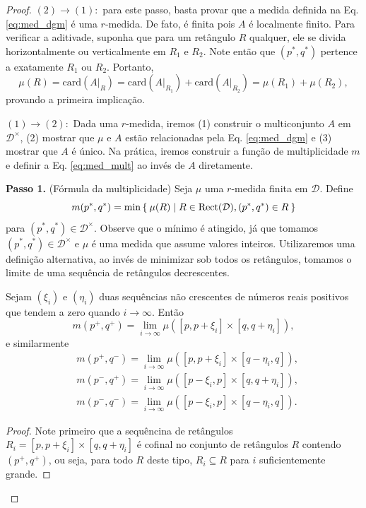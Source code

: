 \begin{proof}
$(2) \to (1):$ para este passo, basta provar que a medida definida na Eq. \eqref{eq:med_dgm} é uma $r$-medida.
De fato, é finita pois $A$ é localmente finito. Para verificar a aditivade, suponha que para um retângulo
$R$ qualquer, ele se divida horizontalmente ou verticalmente em $R_1$ e $R_2$. Note então que $(p^*,q^*)$
pertence a exatamente $R_1$ ou $R_2$. Portanto, 
\begin{equation*}
    \mu(R) = \text{card}(\left.A\right|_R) = \text{card}(\left.A\right|_{R_1}) + \text{card}(\left.A\right|_{R_2})
     = \mu(R_1) + \mu(R_2),
\end{equation*}
provando a primeira implicação. 

\noindent$(1) \to (2):$ Dada uma $r$-medida, iremos (1) construir o multiconjunto $A$ em $\mathcal{D}^\times$,
(2) mostrar que $\mu$ e $A$ estão relacionadas pela Eq. \eqref{eq:med_dgm} e (3) mostrar que $A$ é único. Na 
prática, iremos construir a função de multiplicidade $m$ e definir a Eq. \eqref{eq:med_mult} ao invés de $A$ diretamente.

\textbf{Passo 1.} (Fórmula da multiplicidade) Seja $\mu$ uma $r$-medida finita em $\mathcal{D}$. Define
\begin{equation}
    m(p^*, q^*) = \min \Set{\mu(R) | R \in \text{Rect}(\mathcal{D}), (p^*, q^*) \in R}
\end{equation}  
para $(p^*, q^*) \in \mathcal{D}^\times$. Observe que o mínimo é atingido, já que tomamos $(p^*, q^*) \in \mathcal{D}^\times$
e $\mu$ é uma medida que assume valores inteiros. Utilizaremos uma definição alternativa, ao invés de minimizar sob 
todos os retângulos, tomamos o limite de uma sequência de retângulos decrescentes.  
\begin{lema}\label{teo:lem_med}
    Sejam $(\xi_i)$ e $(\eta_i)$ duas sequências não crescentes de números reais positivos
    que tendem a zero quando $i \to \infty$. Então
    \begin{equation*}
        m(p^+, q^+) = \lim_{i\to\infty} \mu([p,p+\xi_i] \times [q, q+\eta_i]),
    \end{equation*}
    e similarmente
    \begin{align*}
        & m(p^+, q^-) = \lim_{i\to\infty} \mu([p,p+\xi_i] \times [q-\eta_i, q]), \\
        & m(p^-, q^+) = \lim_{i\to\infty} \mu([p-\xi_i,p] \times [q, q+\eta_i]), \\
        & m(p^-, q^-) = \lim_{i\to\infty} \mu([p-\xi_i,p] \times [q-\eta_i,q]).
    \end{align*}
\end{lema}
\begin{proof}
    Note primeiro que a sequêncina de retângulos $R_i = [p, p+\xi_i] \times [q, q+\eta_i]$ é 
    cofinal no conjunto de retângulos $R$ contendo $(p^+, q^+)$, ou seja, para todo $R$ deste 
    tipo, $R_i \subseteq R$ para $i$ suficientemente grande.
    

\end{proof}
\end{proof}
